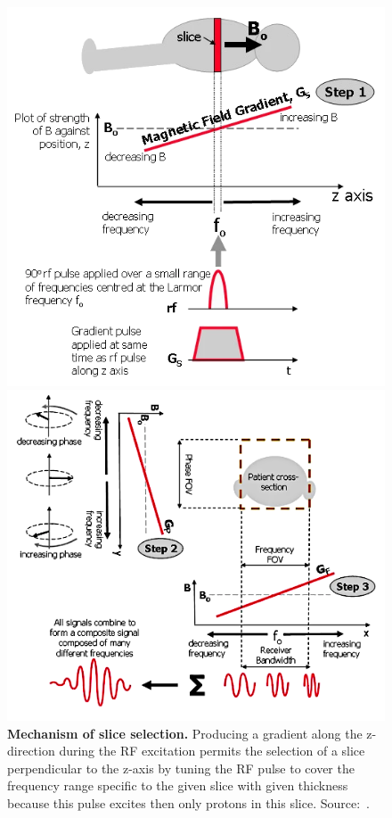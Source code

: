 \begin{figure}[tb]
    \centering
    \begin{minipage}{.43\textwidth}
        \centering
        \includegraphics[width=\linewidth]{images/slice_selection.png}
        \caption{\textbf{Mechanism of slice selection.} Producing a gradient along the z-direction during the RF excitation permits the selection of a slice perpendicular to the z-axis by tuning the RF pulse to cover the frequency range specific to the given slice with given thickness because this pulse excites then only protons in this slice. Source:~\cite{ridgway_cardiovascular_2010}.}
        \label{fig:slice_selection}
    \end{minipage}%
    \hspace{0.03\textwidth}
    \begin{minipage}{0.53\textwidth}
        \centering
        \includegraphics[width=\linewidth]{images/phase_and_freq_encoding.png}

\end{minipage}
\end{figure}
